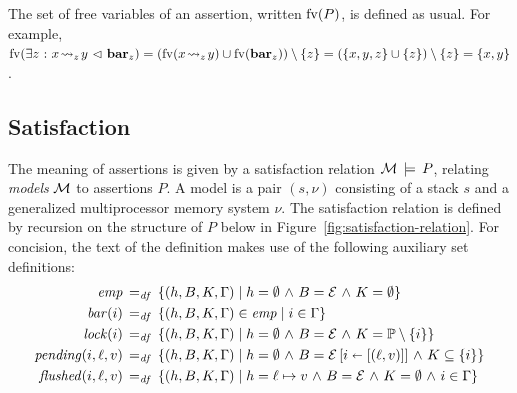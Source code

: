 \documentclass[11pt]{report}
\begin{document}
The set of free variables of an assertion, written $\fv{P}$, is defined as usual. For example, $\fv{\exists z \st x \fwrite{z} y \fseq \fbar{z}} = (\fv{x \fwrite{z} y} \cup \fv{\fbar{z}}) \setminus \set{z} = (\set{x,y,z} \cup \set{z}) \setminus \set{z} = \set{x,y}$. 

\subsection{Satisfaction}

The meaning of assertions is given by a satisfaction relation $\amod \sentails P$, relating \emph{models} $\amod$ to assertions $P$. A model is a pair $(s,\nu)$ consisting of a stack $s$ and a generalized multiprocessor memory system $\nu$. 
The satisfaction relation is defined by recursion on the structure of $P$ below in Figure~\ref{fig:satisfaction-relation}. For concision, the text of the definition makes use of the following auxiliary set definitions: \begin{align*}
  \mathit{emp} \eqdef & \setof{(h,B,K,\Gamma)}{h = \nil \conj B = \arnil \conj K = \nil} \\ 
  \mathit{bar}(i) \eqdef & \setof{(h,B,K,\Gamma) \in \mathit{emp}}{i \in \Gamma} \\ 
  \mathit{lock}(i) \eqdef & \setof{(h,B,K,\Gamma)}{h = \nil \conj B = \arnil \conj K = \setprocessors \setminus \set{i}} \\ 
  \mathit{pending}(i,\ell,v) \eqdef & \setof{(h,B,K,\Gamma)}{h = \nil \conj B = \funup{\arnil}{\ptup{i}{\llit{(\ell,v)}}} \conj K \subseteq \set{i}} \\ 
  \mathit{flushed}(i,\ell,v) \eqdef & \setof{(h,B,K,\Gamma)}{h = \ell \mapsto v \conj B = \arnil \conj K = \nil \conj i \in \Gamma} 
\end{align*}
\end{document}
